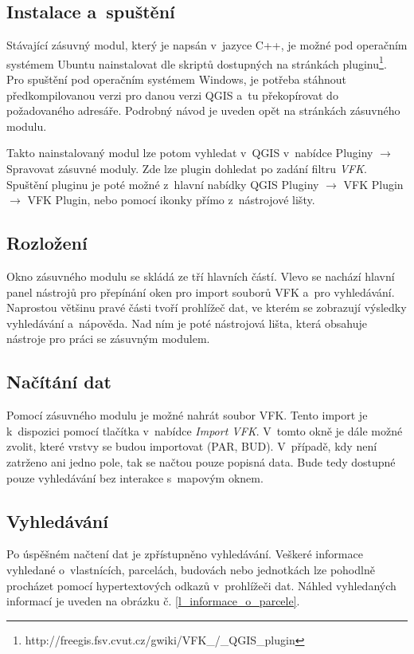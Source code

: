 \documentclass[a4paper,12pt,oneside]{book}
\begin{document}
\subsection{Instalace a~spuštění}
Stávající zásuvný modul, který je napsán v~jazyce C++, je možné pod operačním systémem Ubuntu nainstalovat dle skriptů dostupných na stránkách pluginu\footnote{http://freegis.fsv.cvut.cz/gwiki/VFK\_/\_QGIS\_plugin}. Pro spuštění pod operačním systémem Windows, je potřeba stáhnout předkompilovanou verzi pro danou verzi QGIS a~tu překopírovat do požadovaného adresáře. Podrobný návod je uveden opět na stránkách zásuvného modulu. 

Takto nainstalovaný modul lze potom vyhledat v~QGIS v~nabídce Pluginy $\rightarrow$ Spravovat zásuvné moduly. Zde lze plugin dohledat po zadání filtru \textit{VFK}. Spuštění pluginu je poté možné z~hlavní nabídky QGIS Pluginy $\rightarrow$ VFK Plugin $\rightarrow$ VFK Plugin, nebo pomocí ikonky přímo z~nástrojové lišty.

\subsection{Rozložení}
Okno zásuvného modulu se skládá ze tří hlavních částí. Vlevo se nachází hlavní panel nástrojů pro přepínání oken pro import souborů VFK a~pro vyhledávání. Naprostou většinu pravé části tvoří prohlížeč dat, ve kterém se zobrazují výsledky vyhledávání a~nápověda. Nad ním je poté nástrojová lišta, která obsahuje nástroje pro práci se zásuvným modulem.

\subsection{Načítání dat}
Pomocí zásuvného modulu je možné nahrát soubor VFK. Tento import je k~dispozici pomocí tlačítka  v~nabídce \textit{Import VFK}. V~tomto okně je dále možné zvolit, které vrstvy se budou importovat (PAR, BUD). V~případě, kdy není zatrženo ani jedno pole, tak se načtou pouze popisná data. Bude tedy dostupné pouze vyhledávání bez interakce s~mapovým oknem. 

\subsection{Vyhledávání}
Po úspěšném načtení dat je zpřístupněno vyhledávání. Veškeré informace vyhledané o~vlastnících, parcelách, budovách nebo jednotkách lze pohodlně procházet pomocí hypertextových odkazů v~prohlížeči dat. Náhled vyhledaných informací je uveden na obrázku č. \ref{l_informace_o_parcele}.
\end{document}
